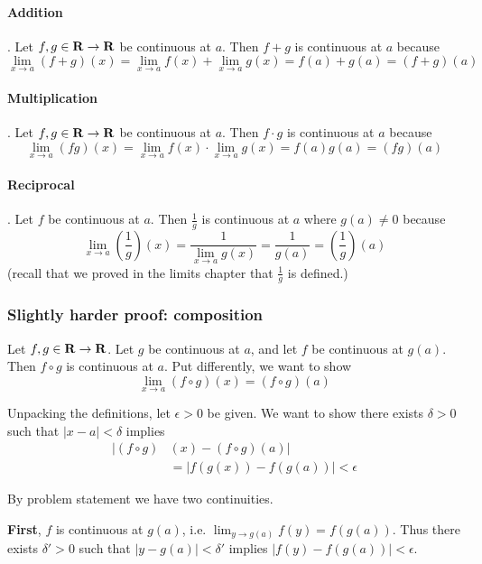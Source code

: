 \vs

\paragraph{Addition}. Let $f,g\in\mathbf{R}\to\mathbf{R}$ be continuous at $a$. Then
$f+g$ is continuous at $a$ because
\[\lim_{x\to a}(f+g)(x)=\lim_{x\to a}f(x)+\lim_{x\to a}g(x)=f(a)+g(a)=(f+g)(a)\]

\paragraph{Multiplication}. Let $f,g\in\mathbf{R}\to\mathbf{R}$ be continuous at $a$. Then
$f\cdot g$ is continuous at $a$ because
\[\lim_{x\to a}(fg)(x)=\lim_{x\to a}f(x)\cdot\lim_{x\to a}g(x)=f(a)g(a)=(fg)(a)\]

\paragraph{Reciprocal}. Let $f$ be continuous at $a$. Then $\frac{1}{g}$
is continuous at $a$ where $g(a)\neq 0$ because
\[\lim_{x\to a}\left(\frac{1}{g}\right)(x)=\frac{1}{\lim_{x\to a}g(x)}=\frac{1}{g(a)}=\left(\frac{1}{g}\right)(a)\]
(recall that we proved in the limits chapter that $\frac{1}{g}$ is defined.)

\subsubsection*{Slightly harder proof: composition}

Let $f,g\in\mathbf{R}\to\mathbf{R}$. Let $g$ be continuous at $a$, and let $f$ be
continuous at $g(a)$. Then $f\circ g$ is continuous at $a$. Put
differently, we want to show
\[\lim_{x\to a}(f\circ g)(x)=(f\circ g)(a)\]

Unpacking the definitions, let $\epsilon>0$ be given. We want to show there
exists $\delta>0$ such that $|x-a|<\delta$ implies
\begin{align*}
    |(f\circ g)&(x)-(f\circ g)(a)|\\
    &=|f(g(x))-f(g(a))|<\epsilon
\end{align*}

By problem statement we have two continuities.

\vs

\textbf{First}, $f$ is continuous at $g(a)$, i.e.
$\lim_{y\to g(a)}f(y)=f(g(a))$. Thus there exists $\delta'>0$ such that
$|y-g(a)|<\delta'$ implies $|f(y)-f(g(a))|<\epsilon$.

\vs


